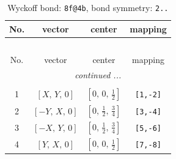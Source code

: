 \documentclass[fleqn,8pt]{jsarticle}
\begin{document}
\renewcommand{\arraystretch}{1.2}
\begin{longtable}{cccc}
\caption{Wyckoff bond: {\tt 8f@4b}, bond symmetry: {\tt 2..}}
 \\
 \hline \hline
No. & vector & center & mapping \\ \hline \endfirsthead

\multicolumn{3}{l}{\tablename\ \thetable{}} \\
 \hline \hline
No. & vector & center & mapping \\ \hline \endhead

 \hline \hline
\multicolumn{3}{r}{\footnotesize\it continued ...} \\ \endfoot

 \hline \hline
\multicolumn{3}{r}{} \\ \endlastfoot

1 & $\left[ X,\, Y,\, 0 \right]$ & $\left[ 0,\, 0,\, \frac{1}{2} \right]$ & {\tt [1,-2]} \\ \hline
2 & $\left[ - Y,\, X,\, 0 \right]$ & $\left[ 0,\, \frac{1}{2},\, \frac{3}{4} \right]$ & {\tt [3,-4]} \\ \hline
3 & $\left[ - X,\, Y,\, 0 \right]$ & $\left[ 0,\, \frac{1}{2},\, \frac{3}{4} \right]$ & {\tt [5,-6]} \\ \hline
4 & $\left[ Y,\, X,\, 0 \right]$ & $\left[ 0,\, 0,\, \frac{1}{2} \right]$ & {\tt [7,-8]} \\
\end{longtable}
\renewcommand{\arraystretch}{1.2}
\end{document}
